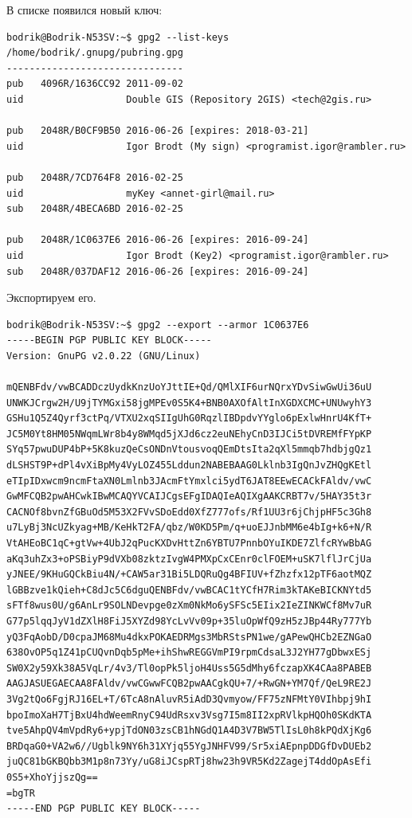 В списке появился новый ключ:

\begin{verbatim}
bodrik@Bodrik-N53SV:~$ gpg2 --list-keys
/home/bodrik/.gnupg/pubring.gpg
-------------------------------
pub   4096R/1636CC92 2011-09-02
uid                  Double GIS (Repository 2GIS) <tech@2gis.ru>

pub   2048R/B0CF9B50 2016-06-26 [expires: 2018-03-21]
uid                  Igor Brodt (My sign) <programist.igor@rambler.ru>

pub   2048R/7CD764F8 2016-02-25
uid                  myKey <annet-girl@mail.ru>
sub   2048R/4BECA6BD 2016-02-25

pub   2048R/1C0637E6 2016-06-26 [expires: 2016-09-24]
uid                  Igor Brodt (Key2) <programist.igor@rambler.ru>
sub   2048R/037DAF12 2016-06-26 [expires: 2016-09-24]

\end{verbatim}

Экспортируем его.

\begin{verbatim}
bodrik@Bodrik-N53SV:~$ gpg2 --export --armor 1C0637E6
-----BEGIN PGP PUBLIC KEY BLOCK-----
Version: GnuPG v2.0.22 (GNU/Linux)

mQENBFdv/vwBCADDczUydkKnzUoYJttIE+Qd/QMlXIF6urNQrxYDvSiwGwUi36uU
UNWKJCrgw2H/U9jTYMGxi58jgMPEv0S5K4+BNB0AXOfAltInXGDXCMC+UNUwyhY3
GSHu1Q5Z4Qyrf3ctPq/VTXU2xqSIIgUhG0RqzlIBDpdvYYglo6pExlwHnrU4KfT+
JC5M0Yt8HM05NWqmLWr8b4y8WMqd5jXJd6cz2euNEhyCnD3IJCi5tDVREMfFYpKP
SYq57pwuDUP4bP+5K8kuzQeCsONDnVtousvoqQEmDtsIta2qXl5mmqb7hdbjgQz1
dLSHST9P+dPl4vXiBpMy4VyLOZ455Lddun2NABEBAAG0Lklnb3IgQnJvZHQgKEtl
eTIpIDxwcm9ncmFtaXN0Lmlnb3JAcmFtYmxlci5ydT6JAT8EEwECACkFAldv/vwC
GwMFCQB2pwAHCwkIBwMCAQYVCAIJCgsEFgIDAQIeAQIXgAAKCRBT7v/5HAY35t3r
CACNOf8bvnZfGBuOd5M53X2FVvSDoEdd0XfZ777ofs/Rf1UU3r6jChjpHF5c3Gh8
u7LyBj3NcUZkyag+MB/KeHkT2FA/qbz/W0KD5Pm/q+uoEJJnbMM6e4bIg+k6+N/R
VtAHEoBC1qC+gtVw+4UbJ2qPucKXDvHttZn6YBTU7PnnbOYuIKDE7ZlfcRYwBbAG
aKq3uhZx3+oPSBiyP9dVXb08zktzIvgW4PMXpCxCEnr0clFOEM+uSK7lflJrCjUa
yJNEE/9KHuGQCkBiu4N/+CAW5ar31Bi5LDQRuQg4BFIUV+fZhzfx12pTF6aotMQZ
lGBBzve1kQieh+C8dJc5C6dguQENBFdv/vwBCAC1tYCfH7Rim3kTAKeBICKNYtd5
sFTf8wus0U/g6AnLr9SOLNDevpge0zXm0NkMo6ySFSc5EIix2IeZINKWCf8Mv7uR
G77p5lqqJyV1dZXlH8FiJ5XYZd98YcLvVv09p+35luOpWfQ9zH5zJBp44Ry777Yb
yQ3FqAobD/D0cpaJM68Mu4dkxPOKAEDRMgs3MbRStsPN1we/gAPewQHCb2EZNGaO
638OvOP5q1Z41pCUQvnDqb5pMe+ihShwREGGVmPI9rpmCdsaL3J2YH77gDbwxESj
SW0X2y59Xk38A5VqLr/4v3/Tl0opPk5ljoH4Uss5G5dMhy6fczapXK4CAa8PABEB
AAGJASUEGAECAA8FAldv/vwCGwwFCQB2pwAACgkQU+7/+RwGN+YM7Qf/QeL9RE2J
3Vg2tQo6FgjRJ16EL+T/6TcA8nAluvR5iAdD3Qvmyow/FF75zNFMtY0VIhbpj9hI
bpoImoXaH7TjBxU4hdWeemRnyC94UdRsxv3Vsg7I5m8II2xpRVlkpHQOh0SKdKTA
tve5AhpQV4mVpdRy6+ypjTdON03zsCB1hNGdQ1A4D3V7BW5TlIsL0h8kPQdXjKg6
BRDqaG0+VA2w6//Ugblk9NY6h31XYjq55YgJNHFV99/Sr5xiAEpnpDDGfDvDUEb2
juQC81bGKBQbb3M1p8n73Yy/uG8iJCspRTj8hw23h9VR5Kd2ZagejT4ddOpAsEfi
0S5+XhoYjjszQg==
=bgTR
-----END PGP PUBLIC KEY BLOCK-----

\end{verbatim}

